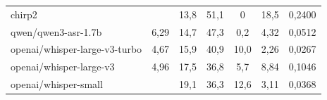 \documentclass{IEEEphot}
\begin{document}
\begin{table}[t]
\begin{tabular}{lcccccc}
\multicolumn{1}{|l|}{chirp2}                                   & \multicolumn{1}{c|}{}                                                                                                                 & \multicolumn{1}{c|}{13,8}                            & \multicolumn{1}{c|}{51,1}                                                                        & \multicolumn{1}{c|}{0}                                                                  & \multicolumn{1}{c|}{18,5}                             & \multicolumn{1}{c|}{0,2400}                              \\
\multicolumn{1}{|l|}{qwen/qwen3-asr-1.7b}                      & \multicolumn{1}{c|}{6,29}                                                                                                             & \multicolumn{1}{c|}{14,7}                            & \multicolumn{1}{c|}{47,3}                                                                        & \multicolumn{1}{c|}{0,2}                                                                & \multicolumn{1}{c|}{4,32}                             & \multicolumn{1}{c|}{0,0512}                              \\
\multicolumn{1}{|l|}{openai/whisper-large-v3-turbo}            & \multicolumn{1}{c|}{4,67}                                                                                                             & \multicolumn{1}{c|}{15,9}                            & \multicolumn{1}{c|}{40,9}                                                                        & \multicolumn{1}{c|}{10,0}                                                               & \multicolumn{1}{c|}{2,26}                             & \multicolumn{1}{c|}{0,0267}                              \\
\multicolumn{1}{|l|}{openai/whisper-large-v3}                  & \multicolumn{1}{c|}{4,96}                                                                                                             & \multicolumn{1}{c|}{17,5}                            & \multicolumn{1}{c|}{36,8}                                                                        & \multicolumn{1}{c|}{5,7}                                                                & \multicolumn{1}{c|}{8,84}                             & \multicolumn{1}{c|}{0,1046}                              \\
\multicolumn{1}{|l|}{openai/whisper-small}                     & \multicolumn{1}{c|}{}                                                                                                                 & \multicolumn{1}{c|}{19,1}                            & \multicolumn{1}{c|}{36,3}                                                                        & \multicolumn{1}{c|}{12,6}                                                               & \multicolumn{1}{c|}{3,11}                             & \multicolumn{1}{c|}{0,0368}                              \\

\end{tabular}
\end{table}
\end{document}
